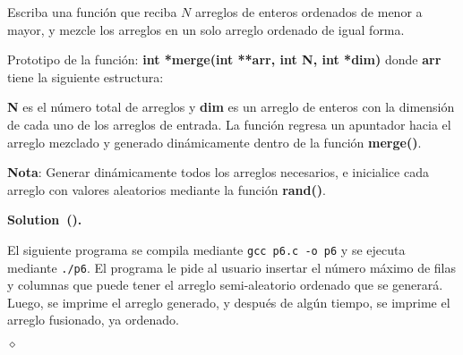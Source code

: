 \documentclass{article}
\theoremstyle{problemstyle}
\newenvironment{solution}[2]{%
  \begin{mdframed}[linewidth=0.8pt,linecolor=Gray,backgroundcolor=Gray!5,roundcorner=5pt, nobreak=#2]%
    \noindent\textbf{Solution\if\relax\detokenize{#1}\relax\else~(#1)\fi.}%
}{%
\hfill $ \diamond $ 
  \end{mdframed}%
}
\begin{document}
\begin{problem}
Escriba una funci\'on que reciba $ N $ arreglos de enteros ordenados de menor a mayor, y mezcle los arreglos en un solo arreglo ordenado de igual forma.

Prototipo de la funci\'on:
\textbf{int *merge(int **arr, int N, int *dim)}
donde \textbf{arr} tiene la siguiente estructura:

\textbf{N} es el n\'umero total de arreglos y \textbf{dim} es un arreglo de enteros con la dimensi\'on de cada uno de los arreglos de entrada. La funci\'on regresa un apuntador hacia el arreglo mezclado y generado din\'amicamente dentro de la funci\'on \textbf{merge()}.


\textbf{Nota}: Generar din\'amicamente todos los arreglos necesarios, e inicialice cada arreglo con valores aleatorios mediante la funci\'on \textbf{rand()}.
\end{problem}
\begin{solution}{}{false}
  El siguiente programa se compila mediante \texttt{gcc p6.c -o p6} y se ejecuta mediante \texttt{./p6}. El programa le pide al usuario insertar el n\'umero m\'aximo de filas y columnas que puede tener el arreglo semi-aleatorio ordenado que se generar\'a. Luego, se imprime el arreglo generado, y despu\'es de alg\'un tiempo, se imprime el arreglo fusionado, ya ordenado.
	
\end{solution}



\end{document}
